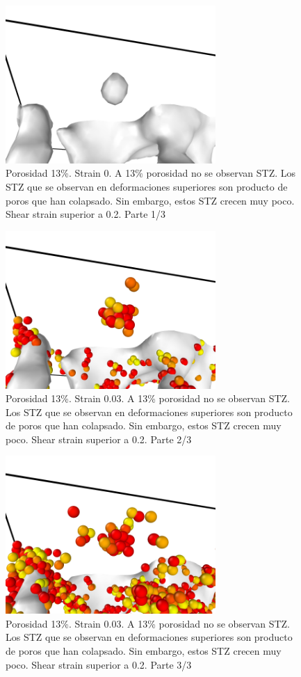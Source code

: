 \documentclass[10pt, oneside]{article} %
\begin{document}
\begin{figure}[H]
\centering
\includegraphics[width=8cm]{Figures/porosidad_13_shearstrain_poro_0.png}
\caption{Porosidad 13\%. Strain 0. A 13\% porosidad no se observan STZ. Los STZ que se observan en deformaciones superiores son producto de poros que han colapsado. Sin embargo, estos STZ crecen muy poco. Shear strain superior a 0.2. Parte 1/3}
\end{figure}

\begin{figure}[H]
\centering
\includegraphics[width=8cm]{Figures/porosidad_13_shearstrain_poro_001.png}
\caption{Porosidad 13\%. Strain 0.03. A 13\% porosidad no se observan STZ. Los STZ que se observan en deformaciones superiores son producto de poros que han colapsado. Sin embargo, estos STZ crecen muy poco. Shear strain superior a 0.2. Parte 2/3}
\end{figure}

\begin{figure}[H]
\centering
\includegraphics[width=8cm]{Figures/porosidad_13_shearstrain_poro_003.png}
\caption{Porosidad 13\%. Strain 0.03. A 13\% porosidad no se observan STZ. Los STZ que se observan en deformaciones superiores son producto de poros que han colapsado. Sin embargo, estos STZ crecen muy poco. Shear strain superior a 0.2. Parte 3/3}
\end{figure}
\end{document}
